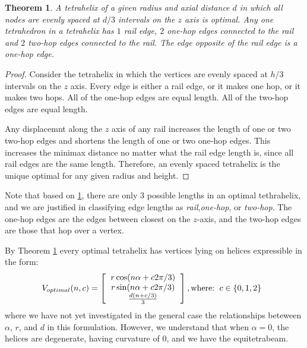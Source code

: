 \documentclass[11pt]{article}
\newtheorem{theorem}{Theorem}
\begin{document}
\begin{theorem}
   \label{eventhirds}
   A tetrahelix of a given radius and axial distance $d$ in which all nodes are evenly spaced at $d/3$ intervals on the $z$ axis is optimal.
     Any one tetrahedron in a tetrahelix has $1$ rail edge, $2$ one-hop edges connected to the rail and $2$ two-hop edges connected to the rail.
  The edge opposite of the rail edge is a one-hop edge.
\end{theorem}

\begin{proof}
    Consider the tetrahelix in which the vertices are evenly spaced at
    $h/3$ intervals on the $z$ axis. Every edge is either a rail edge,
    or it makes one hop, or it makes two hops. All of the one-hop
    edges are equal length.  All of the two-hop edges are equal
    length.
    
    Any displacemnt along the $z$ axis of any rail increases the
    length of one or two two-hop edges and shortens the length of one
    or two one-hop edges.  This increases the minimax distance no
    matter what the rail edge length is, since all rail edges are the
    same length. Therefore, an evenly spaced tetrahelix is the unique
    optimal for any given radius and height.
\end{proof}
  

 Note that based on \ref{eventhirds}, there are only 3 possible lengths in an optimal tethrahelix,
 and we are justified in classifying edge lengths as \emph{rail},\emph{one-hop}, or
\emph{two-hop}. The one-hop edges are the edges between closest on the $z$-axis, and the two-hop edges are those that hop over a vertex.

By Theorem \ref{eventhirds} every optimal tetrahelix has vertices lying on helices expressible in the form:
\[
V_{optimal}(n,c) =
\left [
  \begin{tabular}{c}
   $ r \cos(n \alpha +  c 2 \pi /3)$\\
   $ r \sin(n \alpha +  c 2 \pi /3) $\\
   $ \frac{d(n +c / 3)}{3}   $
  \end{tabular}
  \right ],
\text{where:}
\begin{tabular}{c}
  $c \in \{0,1,2\}$
  \end{tabular}      
\]
where we have not yet investigated in the general case the relationships beteween $\alpha$, $r$, and $d$ in this formulation.
However, we understand that when $\alpha = 0$, the helices are degenerate, having curvature of $0$, and
we have the equitetrabeam.
\end{document}
